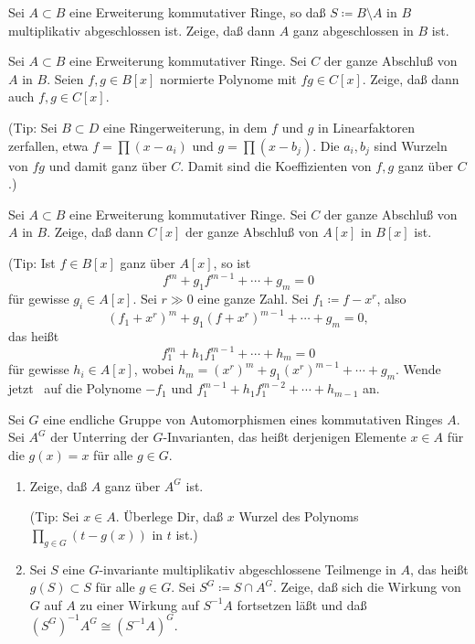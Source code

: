 \begin{exercise}
	Sei \(A \subset B\) eine Erweiterung kommutativer Ringe, so daß
	\(S \coloneqq B \setminus A\) in \(B\) multiplikativ abgeschlossen ist.
	Zeige, daß dann \(A\) ganz abgeschlossen in \(B\) ist.
\end{exercise}

\begin{exercise}
	\label{exer:product_poly_in_closure}
	Sei \(A \subset B\) eine Erweiterung kommutativer Ringe. Sei \(C\) der
	ganze Abschluß von \(A\) in \(B\). Seien \(f, g \in B[x]\) normierte
	Polynome mit \(fg \in C[x]\). Zeige, daß dann auch \(f, g \in C[x]\).
	
	(Tip: Sei \(B \subset D\) eine Ringerweiterung, in dem \(f\) und \(g\)
	in Linearfaktoren zerfallen, etwa \(f = \prod (x - a_i)\) und \(g = \prod
	(x - b_j)\). Die \(a_i, b_j\) sind Wurzeln von \(fg\) und damit ganz über
	\(C\). Damit sind die Koeffizienten von \(f, g\) ganz über \(C\).)
\end{exercise}

\begin{exercise}
	Sei \(A \subset B\) eine Erweiterung kommutativer Ringe. Sei \(C\) der
	ganze Abschluß von \(A\) in \(B\). Zeige, daß dann \(C[x]\) der ganze
	Abschluß von \(A[x]\) in \(B[x]\) ist.

	(Tip: Ist \(f \in B[x]\) ganz über \(A[x]\), so ist \[f^m + g_1 f^{m - 1}
	+ \dotsb + g_m = 0\] für gewisse \(g_i \in A[x]\). Sei \(r \gg 0\) eine ganze
	Zahl. Sei \(f_1 \coloneqq f - x^r\), also
	\[(f_1 + x^r)^m + g_1 (f + x^r)^{m - 1} + \dotsb + g_m = 0,\]
	das heißt \[f_1^m + h_1 f_1^{m - 1} + \dotsb + h_m = 0\]
	für gewisse \(h_i \in A[x]\), wobei \(h_m = (x^r)^m + g_1(x^r)^{m - 1}
	+ \dotsb + g_m\). Wende jetzt~ auf
	die Polynome \(-f_1\) und \(f_1^{m - 1} + h_1 f_1^{m - 2} + \dotsb +
	h_{m - 1}\) an.
\end{exercise}

\begin{exercise}
	Sei \(G\) eine endliche Gruppe von Automorphismen eines kommutativen Ringes
	\(A\). Sei \(A^G\) der Unterring der \(G\)-Invarianten, das heißt derjenigen
	Elemente \(x \in A\) für die \(g(x) = x\) für alle \(g \in G\).
	\begin{enumerate}
	\item
		Zeige, daß \(A\) ganz über \(A^G\) ist.
	
		(Tip: Sei \(x \in A\). Überlege Dir, daß \(x\) Wurzel des Polynoms
		\(\prod\limits_{g \in G} (t - g(x))\) in \(t\) ist.)
	\item
		Sei \(S\) eine \(G\)-invariante multiplikativ abgeschlossene Teilmenge
		in \(A\), das heißt \(g(S) \subset S\) für alle \(g \in G\). Sei
		\(S^G \coloneqq S \cap A^G\). Zeige, daß sich die Wirkung von \(G\)
		auf \(A\) zu einer Wirkung auf \(S^{-1} A\) fortsetzen läßt und daß
		\((S^G)^{-1} A^G \cong (S^{-1} A)^G\).
	\end{enumerate}
\end{exercise}

